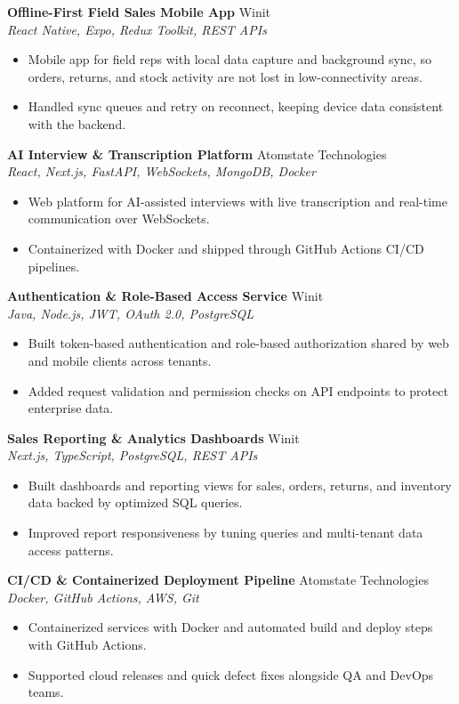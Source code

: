 \documentclass[a4paper,11pt]{article}
\newcommand{\project}[3]{%
  \textbf{#1} \hfill {\small #2}\\[-1pt]
  {\small \textit{#3}}\par\vspace{1pt}}
\begin{document}
\project{Offline-First Field Sales Mobile App}{Winit}{React Native, Expo, Redux Toolkit, REST APIs}
\begin{itemize}
  \item Mobile app for field reps with local data capture and background sync, so orders, returns, and stock activity are not lost in low-connectivity areas.
  \item Handled sync queues and retry on reconnect, keeping device data consistent with the backend.
\end{itemize}

\project{AI Interview \& Transcription Platform}{Atomstate Technologies}{React, Next.js, FastAPI, WebSockets, MongoDB, Docker}
\begin{itemize}
  \item Web platform for AI-assisted interviews with live transcription and real-time communication over WebSockets.
  \item Containerized with Docker and shipped through GitHub Actions CI/CD pipelines.
\end{itemize}

\project{Authentication \& Role-Based Access Service}{Winit}{Java, Node.js, JWT, OAuth 2.0, PostgreSQL}
\begin{itemize}
  \item Built token-based authentication and role-based authorization shared by web and mobile clients across tenants.
  \item Added request validation and permission checks on API endpoints to protect enterprise data.
\end{itemize}

\project{Sales Reporting \& Analytics Dashboards}{Winit}{Next.js, TypeScript, PostgreSQL, REST APIs}
\begin{itemize}
  \item Built dashboards and reporting views for sales, orders, returns, and inventory data backed by optimized SQL queries.
  \item Improved report responsiveness by tuning queries and multi-tenant data access patterns.
\end{itemize}

\project{CI/CD \& Containerized Deployment Pipeline}{Atomstate Technologies}{Docker, GitHub Actions, AWS, Git}
\begin{itemize}
  \item Containerized services with Docker and automated build and deploy steps with GitHub Actions.
  \item Supported cloud releases and quick defect fixes alongside QA and DevOps teams.
\end{itemize}
\end{document}
